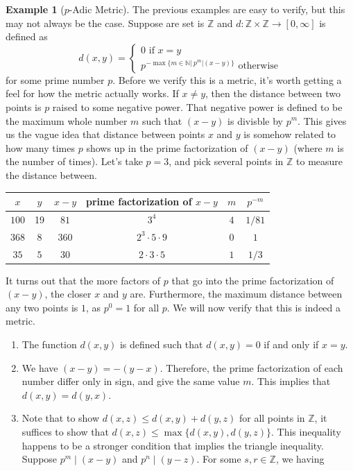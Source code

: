 \documentclass{article}
\newcommand{\N}{\mathbb{N}}
\newcommand{\Z}{\mathbb{Z}}
\theoremstyle{definition}
\newtheorem{example}{Example}[section]
\begin{document}
\begin{example}[$ p $-Adic Metric]
The previous examples are easy to verify, but this may not always be the case. Suppose are set is $ \Z $ and $ d:\Z\times\Z\to[0,\infty] $ is defined as $$ d(x,y)=\begin{cases}
0\text{ if }x=y\\p^{-\max\{m\in\N|\ p^m|(x-y) \}}\text{ otherwise}
\end{cases}$$ for some prime number $ p $. Before we verify this is a metric, it's worth getting a feel for how the metric actually works. If $ x\neq y $, then the distance between two points is $ p $ raised to some negative power. That negative power is defined to be the maximum whole number $ m $ such that $ (x-y) $ is divisble by $ p^m $. This gives us the vague idea that distance between points $ x $ and $ y $ is somehow related to how many times $ p $ shows up in the prime factorization of $ (x-y) $ (where $ m $ is the number of times). Let's take $ p=3 $, and pick several points in $ \Z $ to measure the distance between.    
\begin{center}
\begin{tabular}{cccccc}
	$ x $ & $ y $ & $ x-y $ & prime factorization of $ x-y $ & $ m $ & $ p^{-m} $ \\ \hline
	$ 100 $& 19  &  $ 81 $   &          $ 3^4 $                  &  $ 4 $  &     $ 1/81 $                  \\
$ 368 $	& 8  &  $ 360 $   &            $ 2^3\cdot5\cdot9 $                &  $ 0 $  &  $ 1 $                     \\
$ 35 $	& $ 5 $  &  $ 30 $   &  $ 2\cdot 3\cdot 5 $                           &      $ 1 $ & $ 1/3 $                 
\end{tabular}
\end{center}
It turns out that the more factors of $ p $ that go into the prime factorization of $ (x-y)$, the closer $ x $ and $ y $ are. Furthermore, the maximum distance between any two points is $ 1 $, as $ p^0=1 $ for all $ p $. We will now verify that this is indeed a metric. 
\begin{enumerate}
\item The function $ d(x,y) $ is defined such that $ d(x,y)=0 $ if and only if $ x=y $. 
\item We have $ (x-y)=-(y-x) $. Therefore, the prime factorization of each number differ only in sign, and give the same value $ m $. This implies that $ d(x,y)=d(y,x) $.  
\item Note that to show $ d(x,z)\le d(x,y)+d(y,z) $ for all points in $ \Z $, it suffices to show that $ d(x,z)\le\max\{d(x,y),d(y,z)\} $. This inequality happens to be a stronger condition that implies the triangle inequality. Suppose $ p^m\mid(x-y) $ and $ p^n\mid(y-z) $. For some $ s,r\in\Z $, we having

\end{enumerate}
\end{example}
\end{document}
